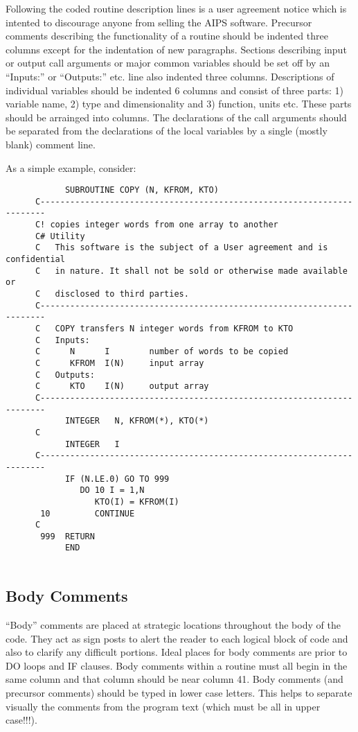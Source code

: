 Following the coded routine description lines is a user agreement
notice which is intented to discourage anyone from selling the AIPS
software.  Precursor comments describing the functionality of a
routine should be indented three columns except for the indentation of
new paragraphs.  Sections describing input or output call arguments or
major common variables should be set off by an ``Inputs:'' or
``Outputs:'' etc. line also indented three columns.  Descriptions of
individual variables should be indented 6 columns and consist of three
parts: 1) variable name, 2) type and dimensionality and 3) function,
units etc.  These parts should be arrainged into columns.
The declarations of the call arguments should be separated from the
declarations of the local variables by a single (mostly blank) comment
line.

   As a simple example, consider:


\begin{verbatim}
            SUBROUTINE COPY (N, KFROM, KTO)
      C-----------------------------------------------------------------------
      C! copies integer words from one array to another
      C# Utility
      C   This software is the subject of a User agreement and is confidential
      C   in nature. It shall not be sold or otherwise made available or
      C   disclosed to third parties.
      C-----------------------------------------------------------------------
      C   COPY transfers N integer words from KFROM to KTO
      C   Inputs:
      C      N      I        number of words to be copied
      C      KFROM  I(N)     input array
      C   Outputs:
      C      KTO    I(N)     output array
      C-----------------------------------------------------------------------
            INTEGER   N, KFROM(*), KTO(*)
      C
            INTEGER   I
      C-----------------------------------------------------------------------
            IF (N.LE.0) GO TO 999
               DO 10 I = 1,N
                  KTO(I) = KFROM(I)
       10         CONTINUE
      C
       999  RETURN
            END


\end{verbatim}

\subsection{Body Comments}
``Body'' comments are placed at strategic locations throughout the body
of the code.  They act as sign posts to alert the reader to each
logical block of code and also to clarify any difficult portions.
Ideal places for body comments are prior to DO loops and IF clauses.
Body comments within a routine must all begin in the same column and
that column should be near column 41.  Body comments (and precursor
comments) should be typed in lower case letters.  This helps to
separate visually the comments from the program text (which must be
all in upper case!!!).


